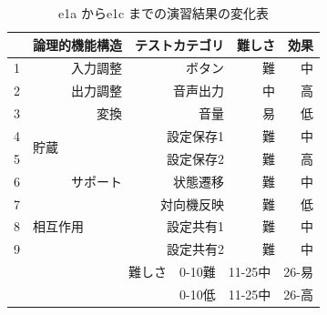 \begin{table}[htbp]
  \centering
  \caption{e1a からe1c までの演習結果の変化表}
    \begin{tabular}{rrrrr}
    \hline
    \multicolumn{1}{|l|}{} & \multicolumn{1}{p{7em}|}{論理的機能構造} & \multicolumn{1}{p{7em}|}{テストカテゴリ} & \multicolumn{1}{p{4.5em}|}{難しさ} & \multicolumn{1}{p{4.5em}|}{効果} \bigstrut\\
    \hline
    \multicolumn{1}{|l|}{1} & \multicolumn{1}{p{6em}|}{入力調整} & \multicolumn{1}{p{6em}|}{ボタン} & \multicolumn{1}{p{6em}|}{難} & \multicolumn{1}{p{6em}|}{中} \bigstrut\\
    \hline
    \multicolumn{1}{|l|}{2} & \multicolumn{1}{p{6em}|}{出力調整} & \multicolumn{1}{p{6em}|}{音声出力} & \multicolumn{1}{p{6em}|}{中} & \multicolumn{1}{p{6em}|}{高} \bigstrut\\
    \hline
    \multicolumn{1}{|l|}{3} & \multicolumn{1}{p{6em}|}{変換} & \multicolumn{1}{p{6em}|}{音量} & \multicolumn{1}{p{6em}|}{易} & \multicolumn{1}{p{6em}|}{低} \bigstrut\\
    \hline
    \multicolumn{1}{|l|}{4} & \multicolumn{1}{l|}{\multirow{2}[4]{*}{貯蔵}} & \multicolumn{1}{p{6em}|}{設定保存1} & \multicolumn{1}{p{6em}|}{難} & \multicolumn{1}{p{6em}|}{中} \bigstrut\\
\cline{1-1}\cline{3-5}    \multicolumn{1}{|l|}{5} & \multicolumn{1}{l|}{} & \multicolumn{1}{p{6em}|}{設定保存2} & \multicolumn{1}{p{6em}|}{難} & \multicolumn{1}{p{6em}|}{高} \bigstrut\\
    \hline
    \multicolumn{1}{|l|}{6} & \multicolumn{1}{p{6em}|}{サポート} & \multicolumn{1}{p{6em}|}{状態遷移} & \multicolumn{1}{p{6em}|}{難} & \multicolumn{1}{p{6em}|}{中} \bigstrut\\
    \hline
    \multicolumn{1}{|r|}{7} & \multicolumn{1}{l|}{\multirow{3}[6]{*}{相互作用}} & \multicolumn{1}{p{6em}|}{対向機反映} & \multicolumn{1}{p{6em}|}{難} & \multicolumn{1}{p{6em}|}{低} \bigstrut\\
\cline{1-1}\cline{3-5}    \multicolumn{1}{|r|}{8} & \multicolumn{1}{l|}{} & \multicolumn{1}{p{6em}|}{設定共有1} & \multicolumn{1}{p{6em}|}{難} & \multicolumn{1}{p{6em}|}{中} \bigstrut\\
\cline{1-1}\cline{3-5}    \multicolumn{1}{|r|}{9} & \multicolumn{1}{l|}{} & \multicolumn{1}{p{6em}|}{設定共有2} & \multicolumn{1}{p{6em}|}{難} & \multicolumn{1}{p{6em}|}{中} \bigstrut\\
    \hline
    \multicolumn{5}{p{30em}}{難しさ　0-10難　11-25中　26-易} \bigstrut[t]\\
    \multicolumn{5}{p{30em}}{0-10低　11-25中　26-高} \bigstrut[t] \\
    \end{tabular}%
  \label{tab:D-3-tab10}%
\end{table}%

